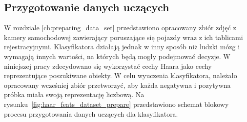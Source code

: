 \subsection{Przygotowanie danych uczących}
\label{subsec:przygotowanie-danych-uczacych}
W rozdziale \ref{ch:preparing_data_set} przedstawiono opracowany zbiór zdjęć z kamery samochodowej zawierający poruszające się pojazdy wraz z ich tablicami rejestracyjnymi.
Klasyfikatora działają jednak w inny sposób niż ludzki mózg i wymagają innych wartości, na których będą mogły podejmować decyzje.
W niniejszej pracy zdecydowano się wykorzystać cechy Haara jako cechy reprezentujące poszukiwane obiekty.
W celu wyuczenia klasyfikatora, należało opracowany wcześniej zbiór przetworzyć, aby każda negatywna i pozytywna próbka miała swoją reprezentację liczbową.
Na rysunku~\ref{fig:haar_feats_dataset_prepare} przedstawiono schemat blokowy procesu przygotowania danych uczących dla klasyfikatora.
